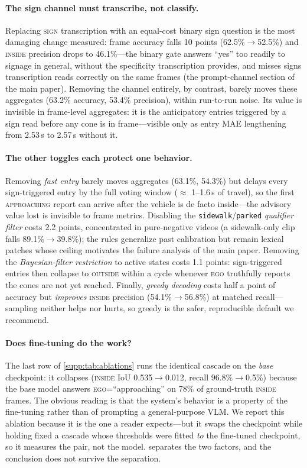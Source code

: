 \documentclass[10pt,twocolumn,letterpaper]{article}
\begin{document}
\paragraph{The sign channel must transcribe, not classify.} Replacing \textsc{sign} transcription with an equal-cost binary sign question is the most damaging change measured: frame accuracy falls 10 points (62.5\%$\to$52.5\%) and \textsc{inside} precision drops to 46.1\%---the binary gate answers ``yes'' too readily to signage in general, without the specificity transcription provides, and misses signs transcription reads correctly on the same frames (the prompt-channel section of the main paper). Removing the channel entirely, by contrast, barely moves these aggregates (63.2\% accuracy, 53.4\% precision), within run-to-run noise.  Its value is invisible in frame-level aggregates: it is the anticipatory entries triggered by a sign read before any cone is in frame---visible only as entry MAE lengthening from 2.53\,s to 2.57\,s without it.

\paragraph{The other toggles each protect one behavior.} Removing \emph{fast entry} barely moves aggregates (63.1\%, 54.3\%) but delays every sign-triggered entry by the full voting window ($\approx$ 1--1.6\,s of travel), so the first \textsc{approaching} report can arrive after the vehicle is de facto inside---the advisory value lost is invisible to frame metrics.  Disabling the \texttt{sidewalk}/\texttt{parked} \emph{qualifier filter} costs 2.2 points, concentrated in pure-negative videos (a sidewalk-only clip falls 89.1\%$\to$39.8\%); the rules generalize past calibration but remain lexical patches whose ceiling motivates the failure analysis of the main paper.  Removing the \emph{Bayesian-filter restriction} to active states costs 1.1 points: sign-triggered entries then collapse to \textsc{outside} within a cycle whenever \textsc{ego} truthfully reports the cones are not yet reached.  Finally, \emph{greedy decoding} costs half a point of accuracy but \emph{improves} \textsc{inside} precision (54.1\%$\to$56.8\%) at matched recall---sampling neither helps nor hurts, so greedy is the safer, reproducible default we recommend.

\paragraph{Does fine-tuning do the work?}  The last row of \cref{supp:tab:ablations} runs the identical cascade on the \emph{base} checkpoint: it collapses (\textsc{inside} IoU 0.535$\to$0.012, recall 96.8\%$\to$0.5\%) because the base model answers \textsc{ego}=``approaching'' on 78\% of ground-truth \textsc{inside} frames.  The obvious reading is that the system's behavior is a property of the fine-tuning rather than of prompting a general-purpose VLM.  We report this ablation because it is the one a reader expects---but it swaps the checkpoint while holding fixed a cascade whose thresholds were fitted \emph{to} the fine-tuned checkpoint, so it measures the pair, not the model.   separates the two factors, and the conclusion does not survive the separation.
\end{document}

